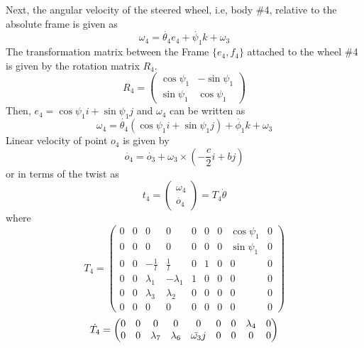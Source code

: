 Next,  the angular velocity of the steered wheel, i.e, body \#4, relative to the absolute frame is given as 
\[\omega_4=\dot{\theta_4}e_4+ \dot{\psi_1} k +\omega_3\]
The transformation matrix between the Frame $\{e_4,f_4\}$ attached to the wheel \#4 is given by the rotation matrix $R_4$. 
\begin{equation}
\label{eqn:slipR4}
R_4=\begin{pmatrix}
\cos \psi_1 & - \sin \psi_1\\
\sin \psi_1 & \cos\psi_1
\end{pmatrix}
\end{equation}
Then, $e_4= \cos\psi_1 i +\sin \psi_1 j$  and $\omega_4$ can be written as 
\[ \omega_4= \dot{\theta_4}( \cos\psi_1 i +\sin \psi_1 j)+ \dot{\phi_1} k +\omega_3 \]
Linear velocity of point $o_4$ is given by
\[ \dot{o_4}=\dot{o_3}+\omega_3 \times (-\frac{c}{2}i+bj) \]
or in terms of the twist as
\begin{equation}
\label{eqn:slip_t4}
t_4=
\begin{pmatrix}
\omega_4\\
\dot{o_4}
\end{pmatrix}=T_4 \dot{\theta}
\end{equation}
where 
\begin{equation}
\label{eqn:slip_T4}
T_4=\left(
\begin{array}{ccccccccc}
0 & 0 & 0 & 0 & 0 & 0 & 0 & \cos\psi_1 & 0 \\
0 & 0 & 0 & 0 & 0 & 0 & 0 & \sin\psi_1 & 0 \\
0 & 0 & -\frac{1}{l} & \frac{1}{l} & 0 & 1 & 0 & 0 & 0 \\
0 & 0 & \lambda_1 & -\lambda_1 & 1 & 0 & 0 & 0 & 0 \\
0 & 0 &\lambda_3 & \lambda_2 & 0 & 0 & 0 & 0 & 0 \\
0 & 0 & 0 & 0 & 0 & 0 & 0 & 0 & 0
\end{array}
\right)
\end{equation}
\begin{equation}
\label{eqn{:slip_dT4}}
\dot{T_4}=\begin{pmatrix}
0 & 0 & 0 & 0 & 0 & 0 & 0 & \lambda_4 & 0\\
0 & 0 & \lambda_7 & \lambda_6 & \bar{\omega_3}j & 0 & 0 & 0 & 0
\end{pmatrix}
\end{equation}

